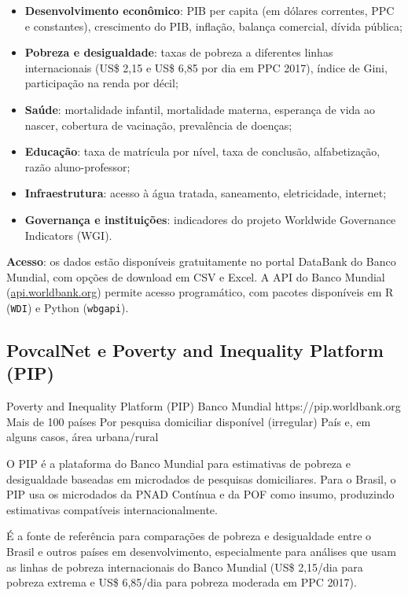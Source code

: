 \begin{itemize}
  \item \textbf{Desenvolvimento econômico}: PIB per capita (em dólares correntes, PPC e constantes), crescimento do PIB, inflação, balança comercial, dívida pública;
  \item \textbf{Pobreza e desigualdade}: taxas de pobreza a diferentes linhas internacionais (US\$ 2,15 e US\$ 6,85 por dia em PPC 2017), índice de Gini, participação na renda por décil;
  \item \textbf{Saúde}: mortalidade infantil, mortalidade materna, esperança de vida ao nascer, cobertura de vacinação, prevalência de doenças;
  \item \textbf{Educação}: taxa de matrícula por nível, taxa de conclusão, alfabetização, razão aluno-professor;
  \item \textbf{Infraestrutura}: acesso à água tratada, saneamento, eletricidade, internet;
  \item \textbf{Governança e instituições}: indicadores do projeto Worldwide Governance Indicators (WGI).
\end{itemize}

\textbf{Acesso}: os dados estão disponíveis gratuitamente no portal DataBank do Banco Mundial, com opções de download em CSV e Excel. A API do Banco Mundial (\url{api.worldbank.org}) permite acesso programático, com pacotes disponíveis em R (\texttt{WDI}) e Python (\texttt{wbgapi}).

\subsection{PovcalNet e Poverty and Inequality Platform (PIP)}

\ficharapida
  {Poverty and Inequality Platform (PIP)}
  {Banco Mundial}
  {https://pip.worldbank.org}
  {Mais de 100 países}
  {Por pesquisa domiciliar disponível (irregular)}
  {País e, em alguns casos, área urbana/rural}

O PIP é a plataforma do Banco Mundial para estimativas de pobreza e desigualdade baseadas em microdados de pesquisas domiciliares. Para o Brasil, o PIP usa os microdados da PNAD Contínua e da POF como insumo, produzindo estimativas compatíveis internacionalmente.

É a fonte de referência para comparações de pobreza e desigualdade entre o Brasil e outros países em desenvolvimento, especialmente para análises que usam as linhas de pobreza internacionais do Banco Mundial (US\$ 2,15/dia para pobreza extrema e US\$ 6,85/dia para pobreza moderada em PPC 2017).


